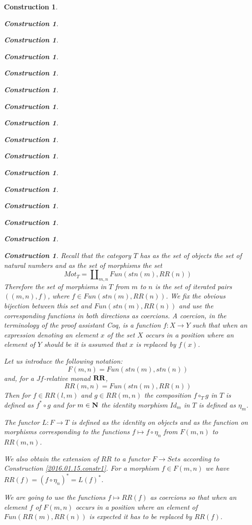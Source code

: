 \documentclass[12pt]{amsart}
\newtheorem{construction}[proposition]{Construction}
\newcommand{\sr}{\rightarrow}
\newcommand{\nn}{{\bf N\rm}}
\newcommand{\nat}{\nn}
\newcommand{\mbind}[1]{{#1^*}}
\newcommand{\hc}{\circ_{T}}
\newcommand{\RR}{{\bf RR}}
\begin{document}
\begin{construction}
\begin{construction}
\begin{construction}
\begin{construction}
\begin{construction}
\begin{construction}
\begin{construction}
\begin{construction}
\begin{construction}
\begin{construction}
\begin{construction}
\begin{construction}
\begin{construction}
\begin{construction}
\begin{construction}
\begin{construction}
Recall that the category $T$ has as the set of objects the set of natural numbers and as the set of morphisms the set 
%
$$Mot_T=\amalg_{m,n} Fun(stn(m),RR(n))$$
%
Therefore the set of morphisms in $T$ from $m$ to $n$ is the set of iterated
pairs $((m,n),f)$, where $f\in Fun(stn(m),RR(n))$. We fix the obvious bijection
between this set and $Fun(stn(m),RR(n))$ and use the corresponding functions in
both directions as coercions. A coercion, in the terminology of the proof
assistant {\em Coq}, is a function $f:X\sr Y$ such that when an expression denoting
an element $x$ of the set $X$ occurs in a position where an element of $Y$
should be it is assumed that $x$ is replaced by $f(x)$.

Let us introduce the following notation:
%
$$F(m,n)=Fun(stn(m),stn(n))$$
%
and, for a $Jf$-relative monad $\RR$,
%
$$RR(m,n)=Fun(stn(m),RR(n))$$
%
Then for $f\in RR(l,m)$ and $g\in RR(m,n)$ the composition $f\hc g$ in $T$ is
defined as $\mbind{f}\circ g$ and for $m\in\nat$ the identity morphism $Id_m$
in $T$ is defined as $\eta_{m}$.

The functor $L:F\sr T$ is defined as the identity on objects and as the
function on morphisms corresponding to the functions $f\mapsto f\circ \eta_{n}$
from $F(m,n)$ to $RR(m,n)$.

We also obtain the extension of $RR$ to a functor $F\sr Sets$ according to
Construction \ref{2016.01.15.constr1}. For a morphism $f\in F(m,n)$ we have
$RR(f)=\mbind{(f\circ \eta_{n})}=\mbind{L(f)}$.

We are going to use the functions $f\mapsto RR(f)$ as coercions so that when an
element $f$ of $F(m,n)$ occurs in a position where an element of
$Fun(RR(m),RR(n))$ is expected it has to be replaced by $RR(f)$.


\end{construction}
\end{construction}
\end{construction}
\end{construction}
\end{construction}
\end{construction}
\end{construction}
\end{construction}
\end{construction}
\end{construction}
\end{construction}
\end{construction}
\end{construction}
\end{construction}
\end{construction}
\end{construction}
\end{document}
